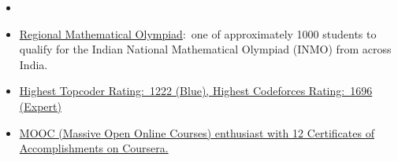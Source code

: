 \documentclass[10pt,a4paper]{article}
\begin{document}
\vspace{0.15cm}
\begin{itemize}[labelindent=1.5em,labelsep=-0.3cm,leftmargin=*]

\item {}

\item \headedsubsection 
{{\normalfont \href{http://www.isical.ac.in/~rmo/}{Regional Mathematical Olympiad}:~one of approximately 1000 students to qualify for the Indian National Mathematical Olympiad (INMO) from across India. 
}}{{{}}}
{}

\item \headedsubsection 
{\href{}{\normalfont Highest Topcoder Rating:~\href{https://www.topcoder.com/members/f1zz0_13/details/?track=DATA_SCIENCE&subTrack=SRM&tab=statistics}{1222} (Blue), Highest Codeforces Rating:~\href{http://codeforces.com/profile/thatDarkHorse}{1696} (Expert) 
	}}{{{}}}{{}}

\item \headedsubsection 
{\href{}{\normalfont MOOC (Massive Open Online Courses) enthusiast with 12 Certificates of Accomplishments on Coursera.
}}{{{}}}
{}


\end{itemize}
\end{document}
